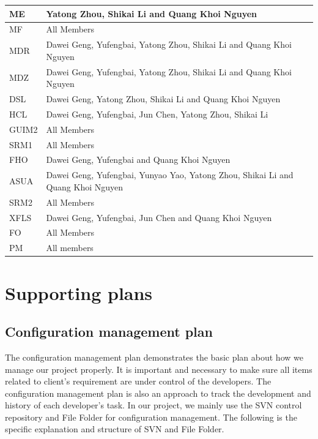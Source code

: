 \documentclass[11pt, a4paper]{report}
\begin{document}
\begin{center}
\begin{tabular}{| l | l |}
  ME 		& 			Yatong Zhou, Shikai Li and Quang Khoi Nguyen 									\\ \hline
  MF 		& 			All Members                                                                     \\ \hline
  MDR 		& 			Dawei Geng, Yufengbai, Yatong Zhou, Shikai Li and Quang Khoi Nguyen				\\ \hline
  MDZ 		& 			Dawei Geng, Yufengbai, Yatong Zhou, Shikai Li and Quang Khoi Nguyen 			\\ \hline
  DSL 		& 			Dawei Geng, Yatong Zhou, Shikai Li and Quang Khoi Nguyen 						\\ \hline
  HCL 		& 			Dawei Geng, Yufengbai, Jun Chen, Yatong Zhou, Shikai Li  						\\ \hline
  GUIM2 	& 			All Members 																	\\ \hline
  SRM1 		& 			All Members 																	\\ \hline
  FHO 		& 			Dawei Geng, Yufengbai and Quang Khoi Nguyen 									\\ \hline
  ASUA 		& 			Dawei Geng, Yufengbai, Yunyao Yao, Yatong Zhou, Shikai Li and Quang Khoi Nguyen \\ \hline
  SRM2 		& 			All Members 																	\\ \hline
  XFLS 		& 			Dawei Geng, Yufengbai, Jun Chen and Quang Khoi Nguyen 							\\ \hline
  FO 		& 			All Members 																	\\ \hline
  PM 		& 			All members 																	\\ \hline
\end{tabular}
\end{center}


\pagebreak


\chapter{Supporting plans}

\section{Configuration management plan}
The configuration management plan demonstrates the basic plan about how we manage our project properly. It is important and necessary to make sure all items related to client's requirement are under control of the developers. The configuration management plan is also an approach to track the development and history of each developer's task. In our project, we mainly use the SVN control repository and File Folder for configuration management. The following is the specific explanation and structure of SVN and File Folder. 
\end{document}
